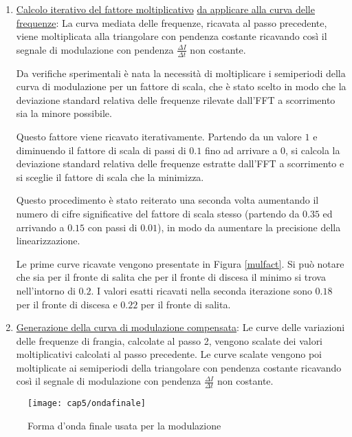 \begin{enumerate}
	In questo modo si ottengono $384$ valori di frequenze per ciascun fronte, in funzione della posizione delle frange all'interno del fronte stesso (Figura \ref{curvamediatafreq}). Questo procedimento è stato effettuato per $100$ segnali acquisiti ed i risultati sono stati poi mediati. \'E stato deciso di associare ai primi $113$ ($=625-512$) campioni scartati valori di frequenza fittizi, approssimando tali valori con una retta di pendenza pari alla pendenza della prima frequenza estratta, mentre agli ultimi $128$ ($=512-384$) campioni è stata associata una retta con pendenza pari alla pendenza dell'ultima frequenza estratta.
	\item \underline{Calcolo iterativo del fattore moltiplicativo} \underline{da applicare alla curva delle} \underline{frequenze}: La curva mediata delle frequenze, ricavata al passo precedente, viene moltiplicata alla triangolare con pendenza costante ricavando così il segnale di modulazione con pendenza $\frac{\Delta I}{\Delta t}$ non costante.
	
	Da verifiche sperimentali è nata la necessità di moltiplicare i semiperiodi della curva di modulazione per un fattore di scala, che è stato scelto in modo che la deviazione standard relativa delle frequenze rilevate dall'FFT a scorrimento sia la minore possibile.
	
	Questo fattore viene ricavato iterativamente. Partendo da un valore $1$ e diminuendo il fattore di scala di passi di $0.1$ fino ad arrivare a $0$, si calcola la deviazione standard relativa delle frequenze estratte dall'FFT a scorrimento e si sceglie il fattore di scala che la minimizza.
	
	Questo procedimento è stato reiterato una seconda volta aumentando il numero di cifre significative del fattore di scala stesso (partendo da $0.35$ ed arrivando a $0.15$ con passi di $0.01$), in modo da aumentare la precisione della linearizzazione.
	
	Le prime curve ricavate vengono presentate in Figura \ref{mulfact}. Si può notare che sia per il fronte di salita che per il fronte di discesa il minimo si trova nell'intorno di $0.2$. I valori esatti ricavati nella seconda iterazione sono $0.18$ per il fronte di discesa e $0.22$ per il fronte di salita.
	\item \underline{Generazione della curva di modulazione compensata}: Le curve delle variazioni delle frequenze di frangia, calcolate al passo 2, vengono scalate dei valori moltiplicativi calcolati al passo precedente. Le curve scalate vengono poi moltiplicate ai semiperiodi della triangolare con pendenza costante ricavando così il segnale di modulazione con pendenza $\frac{\Delta I}{\Delta t}$ non costante.	
\end{enumerate}
\begin{figure}  
  \begin{center}
    \texttt{[image: cap5/ondafinale]}
    \caption{Forma d'onda finale usata per la modulazione}
    \label{ondafinale}
  \end{center}
\end{figure}

